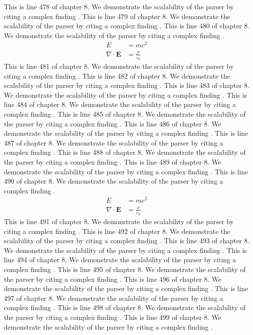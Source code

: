 This is line 478 of chapter 8. We demonstrate the scalability of the parser by citing a complex finding \cite{ref8_478}.
This is line 479 of chapter 8. We demonstrate the scalability of the parser by citing a complex finding \cite{ref8_479}.
This is line 480 of chapter 8. We demonstrate the scalability of the parser by citing a complex finding \cite{ref8_480}.
\begin{align*}
  E &= mc^2 \\
  \nabla \cdot \mathbf{E} &= \frac{\rho}{\varepsilon_0}
\end{align*}
This is line 481 of chapter 8. We demonstrate the scalability of the parser by citing a complex finding \cite{ref8_481}.
This is line 482 of chapter 8. We demonstrate the scalability of the parser by citing a complex finding \cite{ref8_482}.
This is line 483 of chapter 8. We demonstrate the scalability of the parser by citing a complex finding \cite{ref8_483}.
This is line 484 of chapter 8. We demonstrate the scalability of the parser by citing a complex finding \cite{ref8_484}.
This is line 485 of chapter 8. We demonstrate the scalability of the parser by citing a complex finding \cite{ref8_485}.
This is line 486 of chapter 8. We demonstrate the scalability of the parser by citing a complex finding \cite{ref8_486}.
This is line 487 of chapter 8. We demonstrate the scalability of the parser by citing a complex finding \cite{ref8_487}.
This is line 488 of chapter 8. We demonstrate the scalability of the parser by citing a complex finding \cite{ref8_488}.
This is line 489 of chapter 8. We demonstrate the scalability of the parser by citing a complex finding \cite{ref8_489}.
This is line 490 of chapter 8. We demonstrate the scalability of the parser by citing a complex finding \cite{ref8_490}.
\begin{align*}
  E &= mc^2 \\
  \nabla \cdot \mathbf{E} &= \frac{\rho}{\varepsilon_0}
\end{align*}
This is line 491 of chapter 8. We demonstrate the scalability of the parser by citing a complex finding \cite{ref8_491}.
This is line 492 of chapter 8. We demonstrate the scalability of the parser by citing a complex finding \cite{ref8_492}.
This is line 493 of chapter 8. We demonstrate the scalability of the parser by citing a complex finding \cite{ref8_493}.
This is line 494 of chapter 8. We demonstrate the scalability of the parser by citing a complex finding \cite{ref8_494}.
This is line 495 of chapter 8. We demonstrate the scalability of the parser by citing a complex finding \cite{ref8_495}.
This is line 496 of chapter 8. We demonstrate the scalability of the parser by citing a complex finding \cite{ref8_496}.
This is line 497 of chapter 8. We demonstrate the scalability of the parser by citing a complex finding \cite{ref8_497}.
This is line 498 of chapter 8. We demonstrate the scalability of the parser by citing a complex finding \cite{ref8_498}.
This is line 499 of chapter 8. We demonstrate the scalability of the parser by citing a complex finding \cite{ref8_499}.


